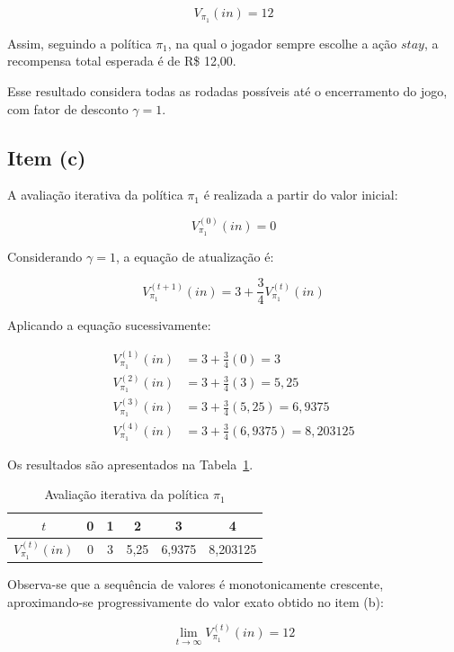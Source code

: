 \[
    \boxed{V_{\pi_1}(in) = 12}
\]

Assim, seguindo a política $\pi_1$, na qual o
jogador sempre escolhe a ação $stay$, a recompensa
total esperada é de R\$ 12,00.

Esse resultado considera todas as rodadas
possíveis até o encerramento do jogo,
com fator de desconto $\gamma = 1$.


\subsection{Item (c)}

A avaliação iterativa da política $\pi_1$ é
realizada a partir do valor inicial:

\[
    V_{\pi_1}^{(0)}(in) = 0
\]

Considerando $\gamma = 1$, a equação
de atualização é:

\[
    V_{\pi_1}^{(t+1)}(in) =
    3 + \frac{3}{4}V_{\pi_1}^{(t)}(in)
\]

Aplicando a equação sucessivamente:

\[
\begin{aligned}
    V_{\pi_1}^{(1)}(in)
    &= 3 + \frac{3}{4}(0) = 3
    \\[6pt]
    V_{\pi_1}^{(2)}(in)
    &= 3 + \frac{3}{4}(3) = 5{,}25
    \\[6pt]
    V_{\pi_1}^{(3)}(in)
    &= 3 + \frac{3}{4}(5{,}25) = 6{,}9375
    \\[6pt]
    V_{\pi_1}^{(4)}(in)
    &= 3 + \frac{3}{4}(6{,}9375)
    = 8{,}203125
\end{aligned}
\]

Os resultados são apresentados na
Tabela~\ref{tab:avaliacao_politica}.

\begin{table}[H]
    \centering
    \caption{Avaliação iterativa da política $\pi_1$}
    \label{tab:avaliacao_politica}
    \begin{tabular}{cccccc}
        \toprule
        $t$ & 0 & 1 & 2 & 3 & 4 \\
        \midrule
        $V_{\pi_1}^{(t)}(in)$
        & 0 & 3 & 5,25 & 6,9375 & 8,203125 \\
        \bottomrule
    \end{tabular}
\end{table}

Observa-se que a sequência de valores é
monotonicamente crescente, aproximando-se
progressivamente do valor exato obtido
no item (b):

\[
    \lim_{t \to \infty} V_{\pi_1}^{(t)}(in) = 12
\]

